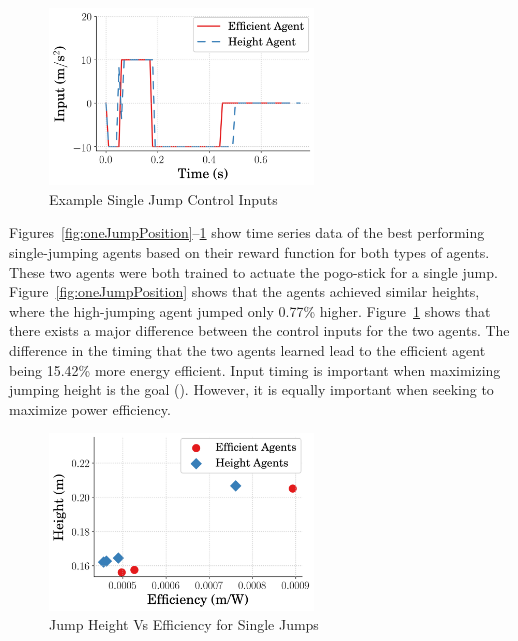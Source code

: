 \documentclass{ifacconf}
\begin{document}
   \begin{figure}[t]
      \begin{center}
         \includegraphics[width=7cm]{figures/timeseries/InputVsTime_OneJump.png}    %
         \caption{Example Single Jump Control Inputs} 
         \label{fig:oneJumpInput}
         \vspace{0.3cm}
      \end{center}
   \end{figure}

   Figures~\ref{fig:oneJumpPosition}--\ref{fig:oneJumpInput} show time series data of the best performing single-jumping agents based on their reward function for both types of agents. These two agents were both trained to actuate the pogo-stick for a single jump. Figure~\ref{fig:oneJumpPosition} shows that the agents achieved similar heights, where the high-jumping agent jumped only 0.77\% higher. Figure~\ref{fig:oneJumpInput} shows that there exists a major difference between the control inputs for the two agents. The difference in the timing that the two agents learned lead to the efficient agent being 15.42\% more energy efficient. Input timing is important when maximizing jumping height is the goal (\cite{Vaughan2013}). However, it is equally important when seeking to maximize power efficiency. 
   
   \begin{figure}[tb]
      \begin{center}
         \includegraphics[width=7cm]{figures/compare_agents/HeightVsEfficiency_OneJump.png}    %
         \caption{Jump Height Vs Efficiency for Single Jumps} 
         \label{fig:oneJumpHeightVsEfficiency}
      \end{center}
   
   \end{figure}
\end{document}
